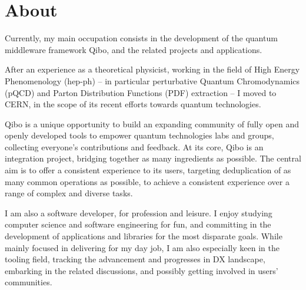 \section{About}
Currently, my main occupation consists in the development of the quantum middleware
framework Qibo, and the related projects and applications.

After an experience as a theoretical physicist, working in the field of High Energy
Phenomenology (hep-ph) -- in particular perturbative Quantum Chromodynamics (pQCD) and
Parton Distribution Functions (PDF) extraction -- I moved to CERN, in the scope of its
recent efforts towards quantum technologies.\newline

Qibo is a unique opportunity to build an expanding community of fully open and openly
developed tools to empower quantum technologies labs and groups, collecting everyone's
contributions and feedback.
At its core, Qibo is an integration project, bridging together as many ingredients as
possible.
The central aim is to offer a consistent experience to its users, targeting deduplication
of as many common operations as possible, to achieve a consistent experience over a
range of complex and diverse tasks.\newline

I am also a software developer, for profession and leisure. 
I enjoy studying computer science and software engineering for fun, and committing in
the development of applications and libraries for the most disparate goals.
While mainly focused in delivering for my day job, I am also especially keen in the
tooling field, tracking the advancement and progresses in DX landscape, embarking in the
related discussions, and possibly getting involved in users' communities.
